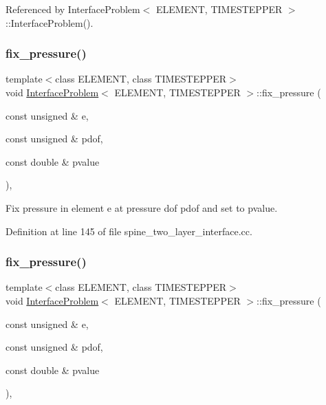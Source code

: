 Referenced by Interface\+Problem$<$ E\+L\+E\+M\+E\+N\+T, T\+I\+M\+E\+S\+T\+E\+P\+P\+E\+R $>$\+::\+Interface\+Problem().

\mbox{\label{classInterfaceProblem_a9d1a04da451b6f41336cb6f3bd910633}} 
\subsubsection{\texorpdfstring{fix\+\_\+pressure()}{fix\_pressure()}\hspace{0.1cm}{\footnotesize\ttfamily [1/2]}}
{\footnotesize\ttfamily template$<$class E\+L\+E\+M\+E\+NT, class T\+I\+M\+E\+S\+T\+E\+P\+P\+ER$>$ \\
void \hyperlink{classInterfaceProblem}{Interface\+Problem}$<$ E\+L\+E\+M\+E\+NT, T\+I\+M\+E\+S\+T\+E\+P\+P\+ER $>$\+::fix\+\_\+pressure (\begin{DoxyParamCaption}\item[{const unsigned \&}]{e,  }\item[{const unsigned \&}]{pdof,  }\item[{const double \&}]{pvalue }\end{DoxyParamCaption})\hspace{0.3cm}{\ttfamily [inline]}, {\ttfamily [private]}}



Fix pressure in element e at pressure dof pdof and set to pvalue. 



Definition at line 145 of file spine\+\_\+two\+\_\+layer\+\_\+interface.\+cc.

\mbox{\label{classInterfaceProblem_a9d1a04da451b6f41336cb6f3bd910633}} 
\subsubsection{\texorpdfstring{fix\+\_\+pressure()}{fix\_pressure()}\hspace{0.1cm}{\footnotesize\ttfamily [2/2]}}
{\footnotesize\ttfamily template$<$class E\+L\+E\+M\+E\+NT, class T\+I\+M\+E\+S\+T\+E\+P\+P\+ER$>$ \\
void \hyperlink{classInterfaceProblem}{Interface\+Problem}$<$ E\+L\+E\+M\+E\+NT, T\+I\+M\+E\+S\+T\+E\+P\+P\+ER $>$\+::fix\+\_\+pressure (\begin{DoxyParamCaption}\item[{const unsigned \&}]{e,  }\item[{const unsigned \&}]{pdof,  }\item[{const double \&}]{pvalue }\end{DoxyParamCaption})\hspace{0.3cm}{\ttfamily [inline]}, {\ttfamily [private]}}



